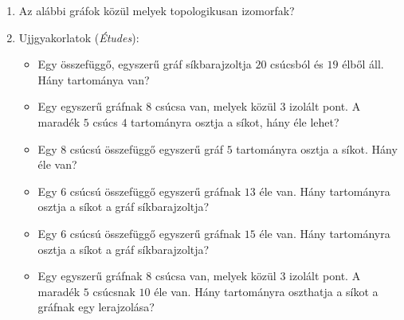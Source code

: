 \documentclass[a4paper, 12pt]{article}
\begin{document}
\begin{enumerate}
            \hrule
            \item Az alábbi gráfok közül melyek topologikusan izomorfak?
			\begin{figure}[!ht]
				\centering
				\begin{subfigure}{0.15\textwidth}
					\centering
					
					\caption{}
				\end{subfigure}
				\begin{subfigure}{0.15\textwidth}
					\centering
					
					\caption{}
				\end{subfigure}
				\begin{subfigure}{0.15\textwidth}
					\centering
					
					\caption{}
				\end{subfigure}
				\begin{subfigure}{0.15\textwidth}
					\centering
					
					\caption{}
				\end{subfigure}
				\begin{subfigure}{0.15\textwidth}
					\centering
					
					\caption{}
				\end{subfigure}
				\begin{subfigure}{0.15\textwidth}
					\centering
					
					\caption{}
				\end{subfigure}
			\end{figure}
                
            \item Ujjgyakorlatok (\textit{Études}):
            \begin{itemize}
                \item Egy összefüggő, egyszerű gráf síkbarajzoltja $20$ csúcsból és $19$ élből áll. Hány tartománya van?
                \item Egy egyszerű gráfnak $8$ csúcsa van, melyek közül $3$ izolált pont. A maradék $5$ csúcs $4$ tartományra osztja a síkot, hány éle lehet?
                \item Egy $8$ csúcsú összefüggő egyszerű gráf $5$ tartományra osztja a síkot. Hány éle van?
                \item Egy $6$ csúcsú összefüggő egyszerű gráfnak $13$ éle van. Hány tartományra osztja a síkot a gráf síkbarajzoltja?
                \item Egy $6$ csúcsú összefüggő egyszerű gráfnak $15$ éle van. Hány tartományra osztja a síkot a gráf síkbarajzoltja?
                \item Egy egyszerű gráfnak $8$ csúcsa van, melyek közül $3$ izolált pont. A maradék $5$ csúcsnak $10$ éle van. Hány tartományra oszthatja a síkot a gráfnak egy lerajzolása?
            \end{itemize}
        

\end{enumerate}
\end{document}
